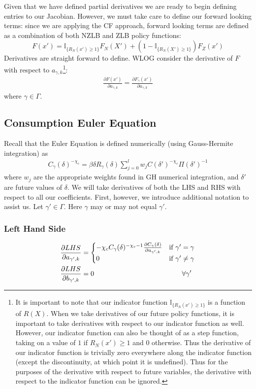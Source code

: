 \documentclass[11pt]{article}
\begin{document}
Given that we have defined partial derivatives we are ready to begin defining entries to our Jacobian. However, we must take care to define our forward looking terms: since we are applying the CF approach, forward looking terms are defined as a combination of both NZLB and ZLB policy functions:
\begin{equation}
F(x') = \mathbb{I}_{\{R_N(x')\ge 1\}}F_{N}(X') + (1-\mathbb{I}_{\{R_N(X')\ge 1\}})F_{Z}(x')
\end{equation} 
Derivatives are straight forward to define. WLOG consider the derivative of $F$ with respect to $a_{\gamma,k}$\footnote{It is important to note that our indicator function $\mathbb{I}_{\{R_N(x')\ge 1\}}$ is a function of $R(X)$. When we take derivatives of our future policy functions, it is important to take derivatives with respect to our indicator function as well. However, our indicator function can also be thought of as a step function, taking on a value of $1$ if $R_N(x')\ge 1$ and $0$ otherwise. Thus the derivative of our indicator function is trivially zero everywhere along the indicator function (except the discontinuity, at which point it is undefined). Thus for the purposes of the derivative with respect to future variables, the derivative with respect to the indicator function can be ignored.}: 
\begin{align}
	\frac{\partial F(x')}{\partial a_{\gamma,k}} = \frac{\partial F_{\gamma}(x')}{\partial a_{\gamma,k}}
\end{align}
where $\gamma\in\Gamma$.

\subsection*{Consumption Euler Equation}
\noindent 
Recall that the Euler Equation is defined numerically (using Gauss-Hermite integration) as 
\begin{align}
C_{\gamma}(\delta)^{-\chi_{c}} = \beta\delta R_{\gamma}(\delta) \sum_{j = 0}^{l}w_jC(\delta')^{-\chi_{c}}\Pi(\delta')^{-1}
\end{align}
where $w_j$ are the appropriate weights found in GH numerical integration, and $\delta'$ are future values of $\delta$. We will take derivatives of both the LHS and RHS with respect to all our coefficients. First, however, we introduce additional notation to assist us. Let $\gamma'\in\Gamma$. Here $\gamma$ may or may not equal $\gamma'$.

\subsubsection*{Left Hand Side}
\begin{align}
\frac{\partial LHS}{\partial a_{\gamma',k}} &=
\begin{cases}
 -\chi_cC_{\gamma}(\delta)^{-\chi_c-1}\frac{\partial C_{\gamma}(\delta)}{\partial a_{\gamma',k}} & \text{if } \gamma' = \gamma \\
 0 & \text{if } \gamma' \neq \gamma
 \end{cases}\\
 \frac{\partial LHS}{\partial b_{\gamma',k}} &= 0 \hspace{4.5cm} \forall \gamma'
\end{align}
\end{document}
